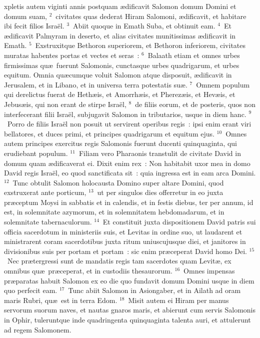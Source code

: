 \bchapter
{}xpletis autem viginti annis postquam \ae dificavit Salomon domum Domini et domum suam,
${}^{2}$~civitates quas dederat Hiram Salomoni, \ae dificavit, et habitare ibi fecit filios Isra\"el.
${}^{3}$~Abiit quoque in Emath Suba, et obtinuit eam.
${}^{4}$~Et \ae dificavit Palmyram in deserto, et alias civitates munitissimas \ae dificavit in Emath.
${}^{5}$~Exstruxitque Bethoron superiorem, et Bethoron inferiorem, civitates muratas habentes portas et vectes et seras~:
${}^{6}$~Balaath etiam et omnes urbes firmissimas qu\ae\ fuerunt Salomonis, cunctasque urbes quadrigarum, et urbes equitum. Omnia qu\ae cumque voluit Salomon atque disposuit, \ae dificavit in Jerusalem, et in Libano, et in universa terra potestatis su\ae .
${}^{7}$~Omnem populum qui derelictus fuerat de Heth\ae is, et Amorrh\ae is, et Pherez\ae is, et Hev\ae is, et Jebus\ae is, qui non erant de stirpe Isra\"el,
${}^{8}$~de filiis eorum, et de posteris, quos non interfecerant filii Isra\"el, subjugavit Salomon in tributarios, usque in diem hanc.
${}^{9}$~Porro de filiis Isra\"el non posuit ut servirent operibus regis~: ipsi enim erant viri bellatores, et duces primi, et principes quadrigarum et equitum ejus.
${}^{10}$~Omnes autem principes exercitus regis Salomonis fuerunt ducenti quinquaginta, qui erudiebant populum.
${}^{11}$~Filiam vero Pharaonis transtulit de civitate David in domum quam \ae dificaverat ei. Dixit enim rex~: Non habitabit uxor mea in domo David regis Isra\"el, eo quod sanctificata sit~: quia ingressa est in eam arca Domini.
${}^{12}$~Tunc obtulit Salomon holocausta Domino super altare Domini, quod exstruxerat ante porticum,
${}^{13}$~ut per singulos dies offerretur in eo juxta pr\ae ceptum Moysi in sabbatis et in calendis, et in festis diebus, ter per annum, id est, in solemnitate azymorum, et in solemnitatem hebdomadarum, et in solemnitate tabernaculorum.
${}^{14}$~Et constituit juxta dispositionem David patris sui officia sacerdotum in ministeriis suis, et Levitas in ordine suo, ut laudarent et ministrarent coram sacerdotibus juxta ritum uniuscujusque diei, et janitores in divisionibus suis per portam et portam~: sic enim pr\ae ceperat David homo Dei.
${}^{15}$~Nec pr\ae tergressi sunt de mandatis regis tam sacerdotes quam Levit\ae , ex omnibus qu\ae\ pr\ae ceperat, et in custodiis thesaurorum.
${}^{16}$~Omnes impensas pr\ae paratas habuit Salomon ex eo die quo fundavit domum Domini usque in diem quo perfecit eam.
${}^{17}$~Tunc abiit Salomon in Asiongaber, et in Ailath ad oram maris Rubri, qu\ae\ est in terra Edom.
${}^{18}$~Misit autem ei Hiram per manus servorum suorum naves, et nautas gnaros maris, et abierunt cum servis Salomonis in Ophir, tuleruntque inde quadringenta quinquaginta talenta auri, et attulerunt ad regem Salomonem.

